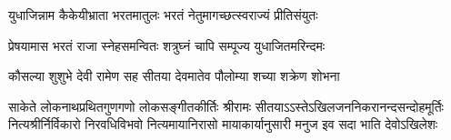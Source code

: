 \twolineshloka
{युधाजिन्नाम कैकेयीभ्राता भरतमातुलः}
{भरतं नेतुमागच्छत्स्वराज्यं प्रीतिसंयुतः} %

\twolineshloka
{प्रेषयामास भरतं राजा स्नेहसमन्वितः}
{शत्रुघ्नं चापि सम्पूज्य युधाजितमरिन्दमः} %

\twolineshloka
{कौसल्या शुशुभे देवी रामेण सह सीतया}
{देवमातेव पौलोम्या शच्या शक्रेण शोभना} %

\fourlineindentedshloka
{साकेते लोकनाथप्रथितगुणगणो लोकसङ्गीतकीर्तिः}
{श्रीरामः सीतयाऽऽस्तेऽखिलजननिकरानन्दसन्दोहमूर्तिः}
{नित्यश्रीर्निर्विकारो निरवधिविभवो नित्यमायानिरासो}
{मायाकार्यानुसारी मनुज इव सदा भाति देवोऽखिलेशः} %


